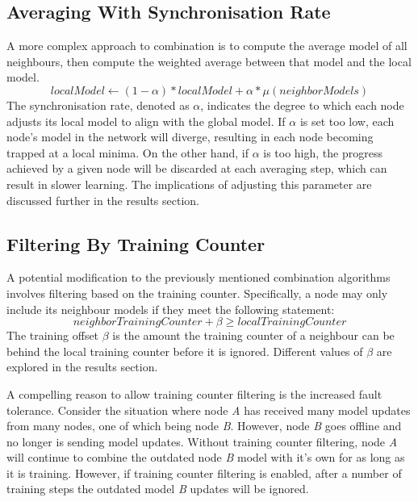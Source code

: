 \subsection{Averaging With Synchronisation Rate}
A more complex approach to combination is to compute the average model of all neighbours, then compute the weighted average between that model and the local model.
\[ localModel \gets (1 - \alpha) * localModel + \alpha * \mu(neighborModels) \]
The synchronisation rate, denoted as $\alpha$, indicates the degree to which each node adjusts its local model to align with the global model. If $\alpha$ is set too low, each node's model in the network will diverge, resulting in each node becoming trapped at a local minima. On the other hand, if $\alpha$ is too high, the progress achieved by a given node will be discarded at each averaging step, which can result in slower learning. The implications of adjusting this parameter are discussed further in the results section.

\subsection{Filtering By Training Counter}
A potential modification to the previously mentioned combination algorithms involves filtering based on the training counter. Specifically, a node may only include its neighbour models if they meet the following statement:
\[neighborTrainingCounter + \beta \ge localTrainingCounter \]
The training offset $\beta$ is the amount the training counter of a neighbour can be behind the local training counter before it is ignored. Different values of $\beta$ are explored in the results section.

A compelling reason to allow training counter filtering is the increased fault tolerance. Consider the situation where node \emph{A} has received many model updates from many nodes, one of which being node \emph{B}. However, node \emph{B} goes offline and no longer is sending model updates. Without training counter filtering, node \emph{A} will continue to combine the outdated node \emph{B} model with it's own for as long as it is training. However, if training counter filtering is enabled, after a number of training steps the outdated model \emph{B} updates will be ignored.

